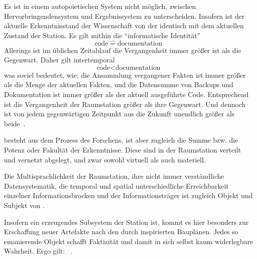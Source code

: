 \begin{newstuff}
    Es ist in einem autopoietischen System nicht möglich, zwischen Hervorbringendensystem und Ergebnissystem zu unterscheiden. Insofern ist der aktuelle Erkenntnisstand der Wissenschaft von der  identisch mit dem aktuellen Zustand der Station. Es gilt mithin die "`informatische Identität"'
    \begin{equation}
        \text{code}\;\widehat{=}\;\text{documentation}
    \end{equation}
    Allerings ist im üblichen Zeitablauf die Vergangenheit immer größer ist als die Gegenwart. Daher gilt intertemporal
    \begin{equation}
        \text{code} < \text{documentation}
    \end{equation}
    was soviel bedeutet, wie: die Ansammlung vergangener Fakten ist immer größer als die Menge der aktuellen Fakten, und die Datensumme von Backups und Dokumentation ist immer größer als der aktuell ausgeführte Code. Entsprechend ist die Vergangenheit der Raumstation größer als ihre Gegenwart. Und dennoch ist von jedem gegenwärtigen Zeitpunkt aus die Zukunft unendlich größer als beide~\cite{encyclopaedia}.


     besteht aus dem Prozess des Forschens, ist aber zugleich die Summe bzw. die Potenz oder Fakultät der Erkenntnisse. Diese sind in der Raumstation verteilt und vernetzt abgelegt, und zwar sowohl virtuell als auch materiell. 
    
    Die Multisprachlichkeit der Raumstation, ihre nicht immer verständliche Datensystematik, die temporal und spatial unterschiedliche Erreichbarkeit einzelner Informationsbrocken und der  Informationsträger ist zugleich Objekt und Subjekt von .

    Insofern  ein erzeugendes Subsystem der Station ist, kommt es hier besonders zur Erschaffung neuer Artefakte nach den durch  inspirierten Bauplänen. Jedes so emanierende Objekt schafft Faktizität und damit in sich selbst kaum widerlegbare Wahrheit. Ergo gilt: ~\cite[S.~47]{cbasebook}.
\end{newstuff}
